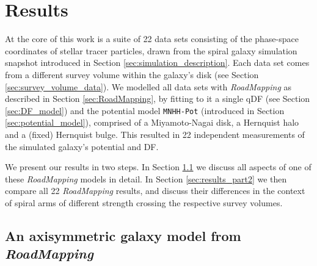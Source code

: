 \documentclass[iop,revtex4,numberedappendix,appendixfloats]{emulateapj}
\newcommand{\RM}{{\sl RoadMapping}}
\begin{document}
\section{Results} \label{sec:results}

At the core of this work is a suite of 22 data sets consisting of the phase-space coordinates of stellar tracer particles, drawn from the spiral galaxy simulation snapshot introduced in Section \ref{sec:simulation_description}. Each data set comes from a different survey volume within the galaxy's disk (see Section \ref{sec:survey_volume_data}). We modelled all data sets with \RM{} as described in Section \ref{sec:RoadMapping}, by fitting to it a single qDF (see Section \ref{sec:DF_model}) and the potential model \texttt{MNHH-Pot} (introduced in Section \ref{sec:potential_model}), comprised of a Miyamoto-Nagai disk, a Hernquist halo and a (fixed) Hernquist bulge. This resulted in 22 independent measurements of the simulated galaxy's potential and DF.

We present our results in two steps. In Section \ref{sec:results_part1} we discuss all aspects of one of these \RM{} models in detail. In Section \ref{sec:results_part2} we then compare all 22 \RM{} results, and discuss their differences in the context of spiral arms of different strength crossing the respective survey volumes.

\subsection{An axisymmetric galaxy model from \RM{}} \label{sec:results_part1}
\end{document}
